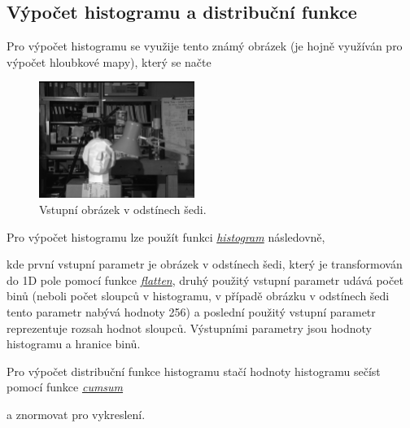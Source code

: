 \documentclass[12pt, a4paper]{article}
\begin{document}
\subsection{Výpočet histogramu a distribuční funkce}
\par{Pro výpočet histogramu se využije tento známý obrázek (je hojně využíván pro výpočet hloubkové mapy), který se načte

\begin{figure}[!ht]
	\centering
	\includegraphics[width=0.45\textwidth]{tsukuba_r.png}
	\caption{Vstupní obrázek v odstínech šedi.}	
\end{figure}
Pro výpočet histogramu lze použít funkci \href{http://docs.scipy.org/doc/numpy/reference/generated/numpy.histogram.html}{\textit{histogram}} následovně,

kde první vstupní parametr je obrázek v odstínech šedi, který je transformován do 1D pole pomocí funkce \href{http://docs.scipy.org/doc/numpy/reference/generated/numpy.ndarray.flatten.html}{\textit{flatten}}, druhý použitý vstupní parametr udává počet binů (neboli počet sloupců v histogramu, v případě obrázku v odstínech šedi tento parametr nabývá hodnoty 256) a poslední použitý vstupní parametr reprezentuje rozsah hodnot sloupců. Výstupními parametry jsou hodnoty histogramu a hranice binů.
}

\par{Pro výpočet distribuční funkce histogramu stačí hodnoty histogramu sečíst pomocí funkce \href{http://docs.scipy.org/doc/numpy/reference/generated/numpy.cumsum.html}{\textit{cumsum}}

a znormovat pro vykreslení.

}
\end{document}
